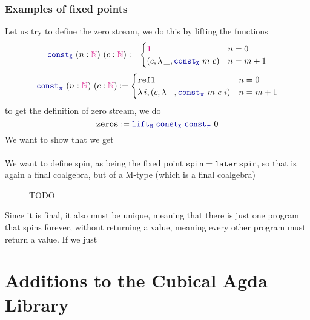 \documentclass[twoside,11pt,openright]{report}
\newcommand*{\type}[1]{\textcolor{magenta!90!black}{#1}}
\newcommand*{\unit}{\type{\textbf{1}}}
\newcommand*{\function}[1]{\textcolor{blue!60!black}{\mathtt{#1}}}
\begin{document}
\subsection{Examples of fixed points}
Let us try to define the zero stream, we do this by lifting the functions
\begin{equation}
  \function{const_X}~(n : \type{\mathbb{N}})~(c : \type{\mathbb{N}})  := \begin{cases} \unit & n = 0 \\ (c , \lambda\,\_, \function{const_X}~m~c) & n = m + 1 \end{cases}
\end{equation}
\begin{equation}
  \function{const_\pi}~(n : \type{\mathbb{N}})~(c : \type{\mathbb{N}}) := \begin{cases} \mathtt{refl} & n = 0 \\ \lambda\,i,(c , \lambda\,\_, \function{const_\pi}~m~c~i) & n = m + 1 \end{cases}
\end{equation}
to get the definition of zero stream, we do
\begin{equation}
  \mathtt{zeros} := \function{lift_M}~\function{const_X}~\function{const_\pi}~0
\end{equation}
We want to show that we get 
\\ \\
We want to define spin, as being the fixed point \(\mathtt{spin} = \mathtt{later}~\mathtt{spin}\), so that is again a final coalgebra, but of a M-type (which is a final coalgebra)

\begin{figure}[h]
  \centering
  \caption{TODO}
\end{figure}
\noindent Since it is final, it also must be unique, meaning that there is just one program that spins forever, without returning a value, meaning every other program must return a value. If we just



\chapter{Additions to the Cubical Agda Library}
\end{document}
